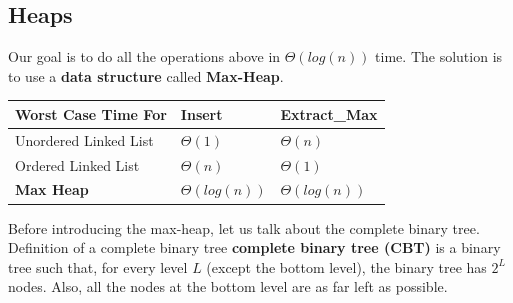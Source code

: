 \documentclass{article}
\begin{document}
\subsection{Heaps}
\begin{flushleft}Our goal is to do all the operations above in $\Theta(log(n))$ time. The solution is to use a \textbf{data structure} called \textbf{Max-Heap}. \end{flushleft}
\begin{table}[h]
\begin{tabular}{|l|l|l|}
\hline
Worst Case Time For   & Insert & Extract\_Max \\ \hline
Unordered Linked List & $\Theta(1)$      &  $\Theta(n)$            \\ \hline
Ordered Linked List   &  $\Theta(n)$      &  $\Theta(1)$            \\ \hline
\textbf{Max Heap}     &  $\Theta(log(n))$ & $\Theta(log(n))$       \\ \hline
\end{tabular}
\end{table}
Before introducing the max-heap, let us talk about the complete binary tree. Definition of a complete binary tree \textbf{complete binary tree (CBT)} is a binary tree such that, for every level $L$ (except the bottom level), the binary tree has $2^L$ nodes. Also, all the nodes at the bottom level are as far left as possible.
\newpage
\end{document}
